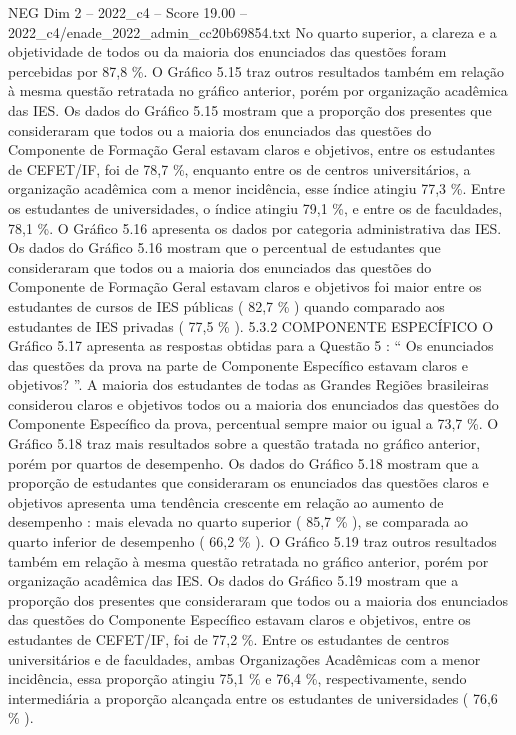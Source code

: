 \begin{textsample}{NEG Dim 2 – 2022\_c4 – Score 19.00 – 2022\_c4/enade\_2022\_admin\_cc20b69854.txt}
No quarto superior, a clareza e a objetividade de todos ou da maioria dos enunciados das questões foram percebidas por 87,8 \%.
O Gráfico 5.15 traz outros resultados também em relação à mesma questão retratada no gráfico anterior, porém por organização acadêmica das IES.
Os dados do Gráfico 5.15 mostram que a proporção dos presentes que consideraram que todos ou a maioria dos enunciados das questões do Componente de Formação Geral estavam claros e objetivos, entre os estudantes de CEFET/IF, foi de 78,7 \%, enquanto entre os de centros universitários, a organização acadêmica com a menor incidência, esse índice atingiu 77,3 \%.
Entre os estudantes de universidades, o índice atingiu 79,1 \%, e entre os de faculdades, 78,1 \%.
O Gráfico 5.16 apresenta os dados por categoria administrativa das IES.
Os dados do Gráfico 5.16 mostram que o percentual de estudantes que consideraram que todos ou a maioria dos enunciados das questões do Componente de Formação Geral estavam claros e objetivos foi maior entre os estudantes de cursos de IES públicas ( 82,7 \% ) quando comparado aos estudantes de IES privadas ( 77,5 \% ). 5.3.2 COMPONENTE ESPECÍFICO O Gráfico 5.17 apresenta as respostas obtidas para a Questão 5 : “ Os enunciados das questões da prova na parte de Componente Específico estavam claros e objetivos? ”.
A maioria dos estudantes de todas as Grandes Regiões brasileiras considerou claros e objetivos todos ou a maioria dos enunciados das questões do Componente Específico da prova, percentual sempre maior ou igual a 73,7 \%.
O Gráfico 5.18 traz mais resultados sobre a questão tratada no gráfico anterior, porém por quartos de desempenho.
Os dados do Gráfico 5.18 mostram que a proporção de estudantes que consideraram os enunciados das questões claros e objetivos apresenta uma tendência crescente em relação ao aumento de desempenho : mais elevada no quarto superior ( 85,7 \% ), se comparada ao quarto inferior de desempenho ( 66,2 \% ).
O Gráfico 5.19 traz outros resultados também em relação à mesma questão retratada no gráfico anterior, porém por organização acadêmica das IES.
Os dados do Gráfico 5.19 mostram que a proporção dos presentes que consideraram que todos ou a maioria dos enunciados das questões do Componente Específico estavam claros e objetivos, entre os estudantes de CEFET/IF, foi de 77,2 \%.
Entre os estudantes de centros universitários e de faculdades, ambas Organizações Acadêmicas com a menor incidência, essa proporção atingiu 75,1 \% e 76,4 \%, respectivamente, sendo intermediária a proporção alcançada entre os estudantes de universidades ( 76,6 \% ).

\end{textsample}

